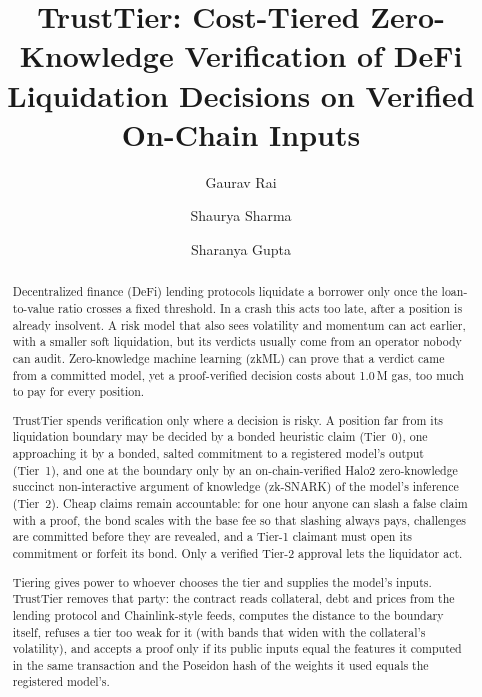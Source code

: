 \documentclass[sigconf,nonacm]{acmart}
\begin{document}
\sloppy

\title{TrustTier: Cost-Tiered Zero-Knowledge Verification of DeFi Liquidation Decisions on Verified On-Chain Inputs}

\author{Gaurav Rai}

\author{Shaurya Sharma}

\author{Sharanya Gupta}

\renewcommand{\shortauthors}{Rai, Sharma and Gupta}

\begin{abstract}
{\renewcommand{\thefootnote}{}}%
Decentralized finance (DeFi) lending protocols liquidate a borrower only once the loan-to-value ratio crosses a fixed threshold. In a crash this acts too late, after a position is already insolvent. A risk model that also sees volatility and momentum can act earlier, with a smaller soft liquidation, but its verdicts usually come from an operator nobody can audit. Zero-knowledge machine learning (zkML) can prove that a verdict came from a committed model, yet a proof-verified decision costs about 1.0\,M gas, too much to pay for every position.

TrustTier spends verification only where a decision is risky. A position far from its liquidation boundary may be decided by a bonded heuristic claim (Tier~0), one approaching it by a bonded, salted commitment to a registered model's output (Tier~1), and one at the boundary only by an on-chain-verified Halo2 zero-knowledge succinct non-interactive argument of knowledge (zk-SNARK) of the model's inference (Tier~2). Cheap claims remain accountable: for one hour anyone can slash a false claim with a proof, the bond scales with the base fee so that slashing always pays, challenges are committed before they are revealed, and a Tier-1 claimant must open its commitment or forfeit its bond. Only a verified Tier-2 approval lets the liquidator act.

Tiering gives power to whoever chooses the tier and supplies the model's inputs. TrustTier removes that party: the contract reads collateral, debt and prices from the lending protocol and Chainlink-style feeds, computes the distance to the boundary itself, refuses a tier too weak for it (with bands that widen with the collateral's volatility), and accepts a proof only if its public inputs equal the features it computed in the same transaction and the Poseidon hash of the weights it used equals the registered model's.


\end{abstract}
\end{document}
